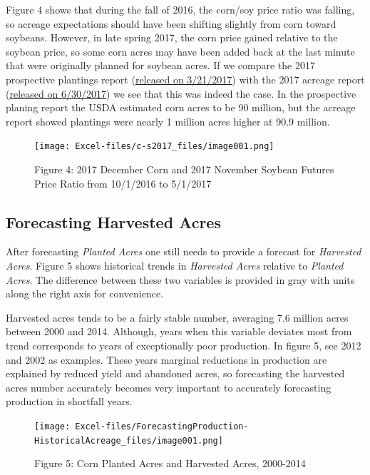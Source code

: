 \documentclass[
]{book}
\begin{document}
Figure 4 shows that during the fall of 2016, the corn/soy price ratio was falling, so acreage expectations should have been shifting slightly from corn toward soybeans. However, in late spring 2017, the corn price gained relative to the soybean price, so some corn acres may have been added back at the last minute that were originally planned for soybean acres. If we compare the 2017 prospective plantings report (\href{http://usda.mannlib.cornell.edu/usda/current/ProsPlan/ProsPlan-03-31-2017.pdf}{released on 3/21/2017}) with the 2017 acreage report (\href{http://usda.mannlib.cornell.edu/usda/current/Acre/Acre-06-30-2017.pdf}{released on 6/30/2017}) we see that this was indeed the case. In the prospective planing report the USDA estimated corn acres to be 90 million, but the acreage report showed plantings were nearly 1 million acres higher at 90.9 million.

\begin{figure}
\centering
\texttt{[image: Excel-files/c-s2017\_files/image001.png]}
\caption{Figure 4: 2017 December Corn and 2017 November Soybean Futures Price Ratio from 10/1/2016 to 5/1/2017}
\end{figure}

\hypertarget{forecasting-harvested-acres}{%
\subsection{Forecasting Harvested Acres}\label{forecasting-harvested-acres}}

After forecasting \emph{Planted Acres} one still needs to provide a forecast for \emph{Harvested Acres}. Figure 5 shows historical trends in \emph{Harvested Acres} relative to \emph{Planted Acres}. The difference between these two variables is provided in gray with units along the right axis for convenience.

Harvested acres tends to be a fairly stable number, averaging 7.6 million acres between 2000 and 2014. Although, years when this variable deviates most from trend corresponds to years of exceptionally poor production. In figure 5, see 2012 and 2002 as examples. These years marginal reductions in production are explained by reduced yield and abandoned acres, so forecasting the harvested acres number accurately becomes very important to accurately forecasting production in shortfall years.

\begin{figure}
\centering
\texttt{[image: Excel-files/ForecastingProduction-HistoricalAcreage\_files/image001.png]}
\caption{Figure 5: Corn Planted Acres and Harvested Acres, 2000-2014}
\end{figure}
\end{document}
